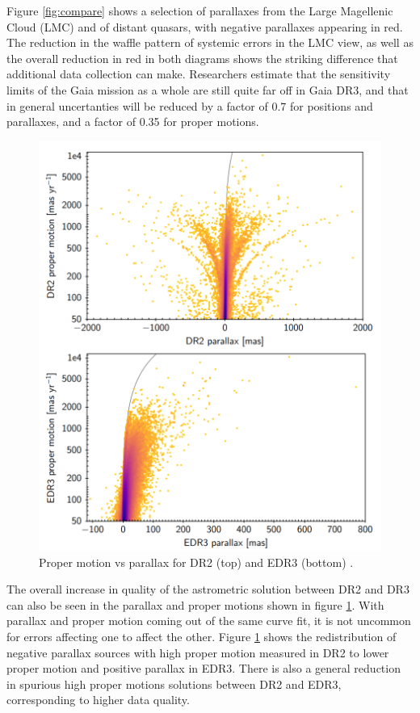 \documentclass[preprint2]{aastex631}
\begin{document}
Figure \ref{fig:compare} shows a selection of parallaxes from the Large Magellenic Cloud (LMC) and of distant quasars, with negative parallaxes appearing in red. The reduction in the waffle pattern of systemic errors in the LMC view, as well as the overall reduction in red in both diagrams shows the striking difference that additional data collection can make. Researchers estimate that the sensitivity limits of the Gaia mission as a whole are still quite far off in Gaia DR3, and that in general uncertanties will be reduced by a factor of 0.7 for positions and parallaxes, and a factor of 0.35 for proper motions\citep{lindegrenGaia2021a}. 
\begin{figure}
	\includegraphics[width=\columnwidth]{parallaxvspropermotiondr2edr3crop.png}
	\caption{Proper motion vs parallax for DR2 (top) and EDR3 (bottom) \cite{fabriciusGaia2021}.}
	\label{fig:comparepm}
\end{figure}

The overall increase in quality of the astrometric solution between DR2 and DR3 can also be seen in the parallax and proper motions shown in figure \ref{fig:comparepm}. With parallax and proper motion coming out of the same curve fit, it is not uncommon for errors affecting one to affect the other. Figure \ref{fig:comparepm} shows the redistribution of negative parallax sources with high proper motion measured in DR2 to lower proper motion and positive parallax in EDR3. There is also a general reduction in spurious high proper motions solutions between DR2 and EDR3, corresponding to higher data quality.
\end{document}
